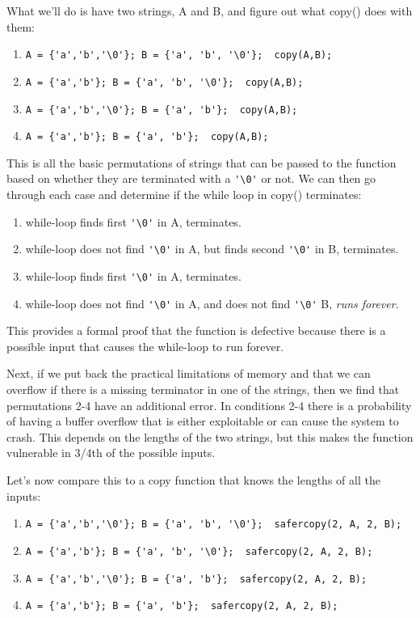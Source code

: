 What we'll do is have two strings, A and B, and figure out what copy() does
with them:

\begin{enumerate}
\item \verb|A = {'a','b','\0'}; B = {'a', 'b', '\0'};  copy(A,B);|
\item \verb|A = {'a','b'}; B = {'a', 'b', '\0'};  copy(A,B);|
\item \verb|A = {'a','b','\0'}; B = {'a', 'b'};  copy(A,B);|
\item \verb|A = {'a','b'}; B = {'a', 'b'};  copy(A,B);|
\end{enumerate}

This is all the basic permutations of strings that can be passed to the function based
on whether they are terminated with a \verb|'\0'| or not.  We can then go through each case
and determine if the while loop in copy() terminates:

\begin{enumerate}
\item while-loop finds first \verb|'\0'| in A, terminates.
\item while-loop does not find \verb|'\0'| in A, but finds second \verb|'\0'| in B, terminates.
\item while-loop finds first \verb|'\0'| in A, terminates.
\item while-loop does not find \verb|'\0'| in A, and does not find \verb|'\0'| B, \emph{runs forever}.
\end{enumerate}

This provides a formal proof that the function is defective because there is a possible
input that causes the while-loop to run forever.

Next, if we put back the practical limitations of memory and that we can overflow if there
is a missing terminator in one of the strings, then we find that permutations 2-4 have
an additional error.  In conditions 2-4 there is a probability of having a buffer overflow
that is either exploitable or can cause the system to crash.  This depends on the lengths
of the two strings, but this makes the function vulnerable in 3/4th of the possible 
inputs.

Let's now compare this to a copy function that knows the lengths of all the inputs:

\begin{enumerate}
\item \verb|A = {'a','b','\0'}; B = {'a', 'b', '\0'};  safercopy(2, A, 2, B);|
\item \verb|A = {'a','b'}; B = {'a', 'b', '\0'};  safercopy(2, A, 2, B);|
\item \verb|A = {'a','b','\0'}; B = {'a', 'b'};  safercopy(2, A, 2, B);|
\item \verb|A = {'a','b'}; B = {'a', 'b'};  safercopy(2, A, 2, B);|
\end{enumerate}

